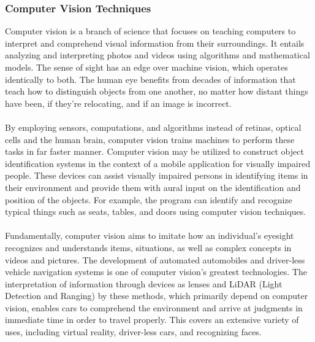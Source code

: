 \documentclass[MScCS]{uccthesis}
\begin{document}
\subsubsection{Computer Vision Techniques}
Computer vision is a branch of science that focuses on teaching computers to interpret and comprehend visual information from their surroundings. It entails analyzing and interpreting photos and videos using algorithms and mathematical models. The sense of sight has an edge over machine vision, which operates identically to both. The human eye benefits from decades of information that teach how to distinguish objects from one another, no matter how distant things have been, if they're relocating, and if an image is incorrect.\\
\\
By employing sensors, computations, and algorithms instead of retinas, optical cells and the human brain, computer vision trains machines to perform these tasks in far faster manner. Computer vision may be utilized to construct object identification systems in the context of a mobile application for visually impaired people. These devices can assist visually impaired persons in identifying items in their environment and provide them with aural input on the identification and position of the objects. For example, the program can identify and recognize typical things such as seats, tables, and doors using computer vision techniques.\\
\\
Fundamentally, computer vision aims to imitate how an individual's eyesight recognizes and understands items, situations, as well as complex concepts in videos and pictures. The development of automated automobiles and driver-less vehicle navigation systems is one of computer vision's greatest technologies. The interpretation of information through devices as lenses and LiDAR (Light Detection and Ranging) by these methods, which primarily depend on computer vision, enables cars to comprehend the environment and arrive at judgments in immediate time in order to travel properly. This covers an extensive variety of uses, including virtual reality, driver-less cars, and recognizing faces.

   
\end{document}
